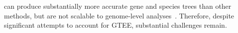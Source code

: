 \documentclass[10pt,a4paper]{article}
\newcommand{\add}[1]{{\color{blue} #1}}
\begin{document}
can produce substantially more accurate gene and species trees than other methods, but are not scalable to genome-level analyses~\citep{leache-rannala,bayzid2013naive,smith2013target,bayzid-incomplete,szollHosi2015inference}.
Therefore, despite significant attempts to account for GTEE, substantial challenges remain.





\end{document}
